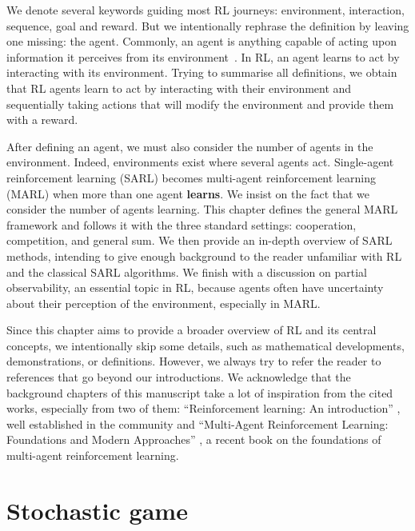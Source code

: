 We denote several keywords guiding most RL journeys: environment, interaction, sequence, goal and reward.
But we intentionally rephrase the definition by leaving one missing: the agent.
Commonly, an agent is anything capable of acting upon information it perceives from its environment~\citep{russel2010}.
In RL, an agent learns to act by interacting with its environment. 
Trying to summarise all definitions, we obtain that RL agents learn to act by interacting with their environment and sequentially taking actions that will modify the environment and provide them with a reward.

After defining an agent, we must also consider the number of agents in the environment.
Indeed, environments exist where several agents act.
Single-agent reinforcement learning (SARL) becomes multi-agent reinforcement learning (MARL) when more than one agent \textbf{learns}.
We insist on the fact that we consider the number of agents learning.
This chapter defines the general MARL framework and follows it with the three standard settings: cooperation, competition, and general sum.
We then provide an in-depth overview of SARL methods, intending to give enough background to the reader unfamiliar with RL and the classical SARL algorithms.
We finish with a discussion on partial observability, an essential topic in RL, because agents often have uncertainty about their perception of the environment, especially in MARL.

Since this chapter aims to provide a broader overview of RL and its central concepts, we intentionally skip some details, such as mathematical developments, demonstrations, or definitions.
However, we always try to refer the reader to references that go beyond our introductions.
We acknowledge that the background chapters of this manuscript take a lot of inspiration from the cited works, especially from two of them: ``Reinforcement learning: An introduction'' \citep{sutton2018reinforcement}, well established in the community and ``Multi-Agent Reinforcement Learning: Foundations and Modern Approaches'' \citep{marl-book}, a recent book on the foundations of multi-agent reinforcement learning.

\section{Stochastic game}
\label{sec:ch2_stochastic_Game}

